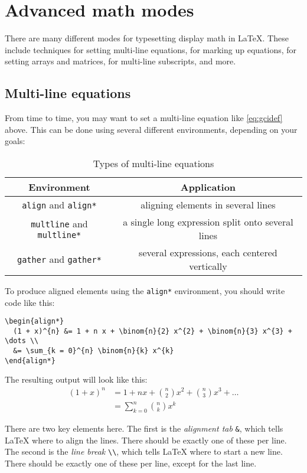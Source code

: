 \documentclass{article}
\newcommand*{\code}[1]{\texttt{#1}}
\begin{document}
\section{Advanced math modes}
There are many different modes for typesetting display math in \LaTeX{}.
These include techniques for setting multi-line equations, for marking up equations, for setting arrays and matrices, for multi-line subscripts, and more.

\subsection{Multi-line equations}
From time to time, you may want to set a multi-line equation like \cref{eq:gcidef} above.
This can be done using several different environments, depending on your goals:
\begin{table}[htb]
  \centering
  \begin{tabular}{c c}
    \toprule
    Environment & Application \\ \midrule
    \code{align} and \code{align*} & aligning elements in several lines \\
    \code{multline} and \code{multline*} & a single long expression split onto several lines \\
    \code{gather} and \code{gather*} & several expressions, each centered vertically \\
    \bottomrule
  \end{tabular}
  \caption{Types of multi-line equations}
  \label{tab:multiline}
\end{table}

To produce aligned elements using the \code{align*} environment, you should write code like this:
\begin{verbatim}
\begin{align*}
  (1 + x)^{n} &= 1 + n x + \binom{n}{2} x^{2} + \binom{n}{3} x^{3} + \dots \\
  &= \sum_{k = 0}^{n} \binom{n}{k} x^{k}
\end{align*}
\end{verbatim}
The resulting output will look like this:
\begin{align*}
  (1 + x)^{n} &= 1 + n x + \binom{n}{2} x^{2} + \binom{n}{3} x^{3} + \dots \\
  &= \sum_{k = 0}^{n} \binom{n}{k} x^{k}
\end{align*}

There are two key elements here.
The first is the \emph{alignment tab} \code{\&}, which tells \LaTeX{} where to align the lines.
There should be exactly one of these per line.
The second is the \emph{line break} \code{\textbackslash{}\textbackslash{}}, which tells \LaTeX{} where to start a new line.
There should be exactly one of these per line, except for the last line.
\end{document}
